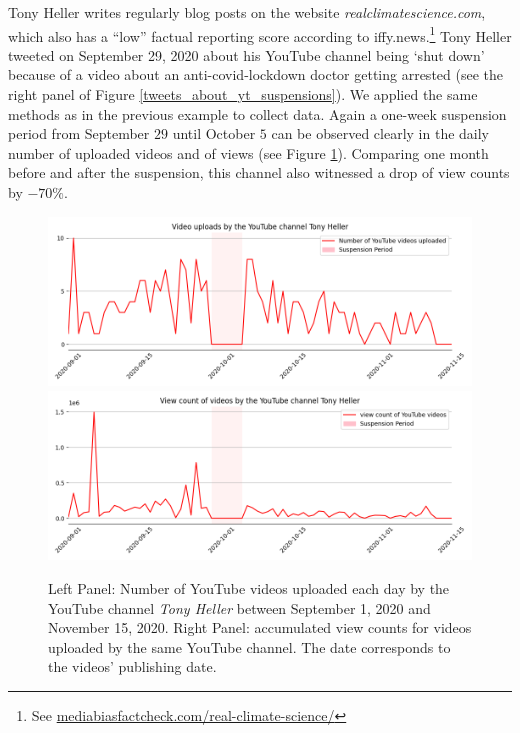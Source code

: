 \documentclass{article}
\begin{document}
Tony Heller writes regularly blog posts on the website {\it realclimatescience.com}, which also has a ``low'' factual reporting score according to iffy.news.\footnote{See \href{https://mediabiasfactcheck.com/real-climate-science/}{mediabiasfactcheck.com/real-climate-science/}}
Tony Heller tweeted on September 29, 2020 about his YouTube channel being `shut down' because of a video about an anti-covid-lockdown doctor getting arrested (see the right panel of Figure \ref{tweets_about_yt_suspensions}).
We applied the same methods as in the previous example to collect data.
Again a one-week suspension period from September $29$ until October $5$ can be observed clearly in the daily number of uploaded videos and of views (see Figure \ref{delete_youtube_tony}).
Comparing one month before and after the suspension, this channel also witnessed a drop of view counts by $-70\%$.

\begin{figure}[h]
\hspace{-2em}
			\includegraphics[scale=0.32]{../figure/delete_youtube_3_tony_heller.png}
			\includegraphics[scale=0.32]{../figure/delete_youtube_4_tony_heller.png}
	\caption{Left Panel: Number of YouTube videos uploaded each day by the YouTube channel {\it Tony Heller} between September 1, 2020 and November 15, 2020. Right Panel: accumulated view counts for videos uploaded by the same YouTube channel. The date corresponds to the videos’  publishing date. 
}
	\label{delete_youtube_tony}
\end{figure}
\end{document}
